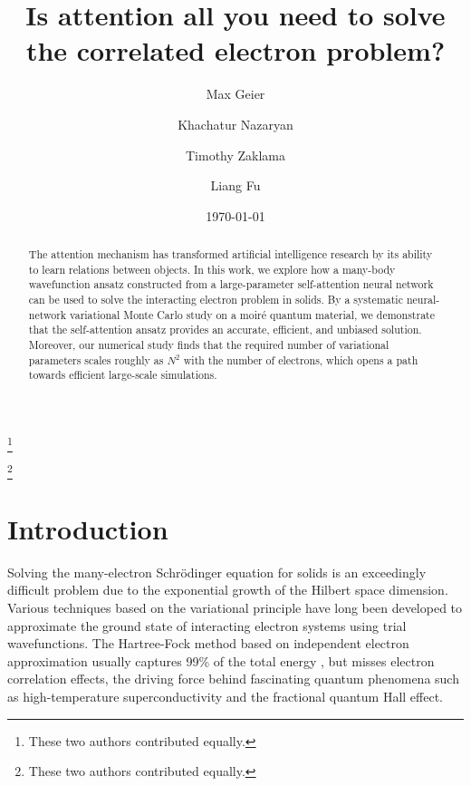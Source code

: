 \documentclass[
 reprint,
 amsmath,amssymb,
 aps, prx,
floatfix,longbibliography,
]{revtex4-2}
\begin{document}
\title{Is attention all you need to solve the correlated electron problem?}

\author{Max Geier}
\thanks{These two authors contributed equally.}

\author{Khachatur Nazaryan}
\thanks{These two authors contributed equally.}

\author{Timothy Zaklama}

\author{Liang Fu}

\date{\today} 

\begin{abstract}
The attention mechanism has transformed artificial intelligence research by its ability to learn relations between objects. 
%
In this work, we explore how a many-body wavefunction ansatz constructed from a large-parameter self-attention neural network can be used to solve the interacting electron problem in solids. 
%
By a systematic neural-network variational Monte Carlo study on a moir\'e quantum material, we demonstrate that the self-attention ansatz provides an accurate, efficient, and unbiased solution.
%
Moreover, our numerical study finds that the required number of variational parameters scales roughly as $N^2$ with the number of electrons, which opens a path towards efficient large-scale simulations.
\end{abstract}

\maketitle

\section{Introduction}

Solving the many-electron Schr\"odinger equation for solids is an exceedingly difficult problem due to the exponential growth of the Hilbert space dimension. 
Various techniques based on the variational principle have long been developed to approximate the ground state of interacting electron systems using trial wavefunctions.  
The Hartree-Fock method based on independent electron approximation \cite{Hartree1928Jan,Fock1930Jan} usually captures 99\% of the total energy \cite{Foulkes2001Jan}, but misses electron correlation effects, the driving force behind fascinating quantum phenomena such as high-temperature superconductivity and the fractional quantum Hall effect. 
\end{document}
